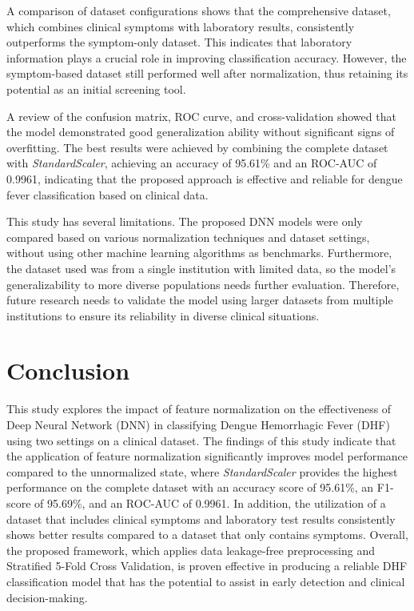 \documentclass[conference]{IEEEtran}
\begin{document}
A comparison of dataset configurations shows that the comprehensive dataset, which combines clinical symptoms with laboratory results, consistently outperforms the symptom-only dataset. This indicates that laboratory information plays a crucial role in improving classification accuracy. However, the symptom-based dataset still performed well after normalization, thus retaining its potential as an initial screening tool.

A review of the confusion matrix, ROC curve, and cross-validation showed that the model demonstrated good generalization ability without significant signs of overfitting. The best results were achieved by combining the complete dataset with \textit{StandardScaler}, achieving an accuracy of 95.61\% and an ROC-AUC of 0.9961, indicating that the proposed approach is effective and reliable for dengue fever classification based on clinical data.

This study has several limitations. The proposed DNN models were only compared based on various normalization techniques and dataset settings, without using other machine learning algorithms as benchmarks. Furthermore, the dataset used was from a single institution with limited data, so the model's generalizability to more diverse populations needs further evaluation. Therefore, future research needs to validate the model using larger datasets from multiple institutions to ensure its reliability in diverse clinical situations.


\section{Conclusion}

This study explores the impact of feature normalization on the effectiveness of Deep Neural Network (DNN) in classifying Dengue Hemorrhagic Fever (DHF) using two settings on a clinical dataset. The findings of this study indicate that the application of feature normalization significantly improves model performance compared to the unnormalized state, where \textit{StandardScaler} provides the highest performance on the complete dataset with an accuracy score of 95.61\%, an F1-score of 95.69\%, and an ROC-AUC of 0.9961. In addition, the utilization of a dataset that includes clinical symptoms and laboratory test results consistently shows better results compared to a dataset that only contains symptoms. Overall, the proposed framework, which applies data leakage-free preprocessing and Stratified 5-Fold Cross Validation, is proven effective in producing a reliable DHF classification model that has the potential to assist in early detection and clinical decision-making.
\end{document}
